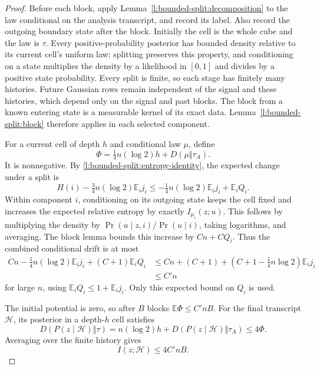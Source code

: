 \begin{proof}
Before each block, apply Lemma~\ref{l:bounded-split:decomposition}
to the law conditional on the analysis transcript, and record its
label.  Also record the outgoing boundary state after the block.
Initially the cell is the whole cube and the law is \(\tau\).
Every positive-probability posterior has bounded density relative to
its current cell's uniform law: splitting preserves this property,
and conditioning on a state multiplies the density by a likelihood
in \([0,1]\) and divides by a positive state probability.
Every split is finite, so each stage has finitely many histories.
Future Gaussian rows remain independent of the signal and these
histories, which depend only on the signal and past blocks.
The block from a known entering state is a measurable kernel of
its exact data.  Lemma~\ref{l:bounded-split:block} therefore applies
in each selected component.

For a current cell of depth \(h\) and conditional law \(\mu\),
define
\begin{equation}\label{l:bounded-split:potential}
 \Phi=\tfrac14n(\log2)h+D(\mu\Vert\tau_A).
\end{equation}
It is nonnegative.  By \eqref{l:bounded-split:entropy-identity},
the expected change under a split is
\[
 H(i)-\tfrac34n(\log2)\mathbb E_i j_i
 \le-\tfrac14n(\log2)\mathbb E_i j_i+\mathbb E_iQ_i.
\]
Within component \(i\), conditioning on its outgoing state keeps
the cell fixed and increases the expected relative entropy by exactly
\(I_{\mu_i}(z;u)\).  This follows by multiplying the density by
\(\Pr(u\mid z,i)/\Pr(u\mid i)\), taking logarithms, and averaging.
The block lemma bounds this increase by \(Cn+CQ_i\).
Thus the combined conditional drift is at most
\begin{equation}\label{l:bounded-split:drift}
 \begin{split}
 Cn-\tfrac14n(\log2)\mathbb E_i j_i+(C+1)\mathbb E_iQ_i
 &\le Cn+(C+1)
   +(C+1-\tfrac14n\log2)\mathbb E_i j_i\\
 &\le C'n
 \end{split}
\end{equation}
for large \(n\), using \(\mathbb E_iQ_i\le1+\mathbb E_i j_i\).
Only this expected bound on \(Q_i\) is used.

The initial potential is zero, so after \(B\) blocks
\(\mathbb E\Phi\le C'nB\).  For the final transcript
\(\mathcal H\), its posterior in a depth-\(h\) cell satisfies
\[
 D(P(z\mid\mathcal H)\Vert\tau)
 =n(\log2)h+D(P(z\mid\mathcal H)\Vert\tau_A)
 \le4\Phi.
\]
Averaging over the finite history gives
\begin{equation}\label{l:bounded-split:total-information}
 I(z;\mathcal H)\le4C'nB.
\end{equation}
\end{proof}

